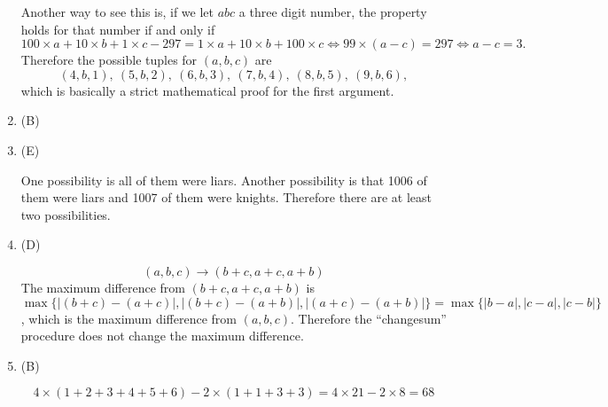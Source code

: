 \documentclass{article}
\begin{document}
\begin{enumerate}
\begin{solution}
Another way to see this is, if we let $abc$ a three digit number,
the property holds for that number if and only if
\[
100 \times a
+ 10 \times b
+ 1 \times c
-297
=
1 \times a
+ 10 \times b
+ 100 \times c
\Leftrightarrow
99 \times (a-c) = 297
\Leftrightarrow
a-c = 3.
\]
Therefore the possible tuples for $(a,b,c)$ are
\[
(4, b, 1),
\ (5, b, 2),
\ (6, b, 3),
\ (7, b, 4),
\ (8, b, 5),
\ (9, b, 6),
\]
which is basically a strict mathematical proof for the first argument.

\end{solution}

\item (B)

\item (E)
\begin{solution}
One possibility is all of them were liars.
Another possibility is that 1006 of them were liars and 1007 of them were knights.
Therefore there are at least two possibilities.
\end{solution}

\item (D)
\begin{solution}
\[
(a, b, c) \to (b+c, a+c, a+b)
\]
The maximum difference from $(b+c, a+c, a+b)$
is $\max\{|(b+c)-(a+c)|, |(b+c)-(a+b)|, |(a+c)-(a+b)|\} = \max\{|b-a|, |c-a|, |c-b|\}$,
which is the maximum difference from $(a,b,c)$.
Therefore the ``changesum'' procedure does not change the maximum difference.
\end{solution}

\item (B)
\begin{solution}
\end{solution}
\[
4 \times (1+2+3+4+5+6) - 2 \times (1 + 1 + 3 + 3) = 4 \times 21 - 2 \times 8 = 68
\]

\end{enumerate}
\end{document}
